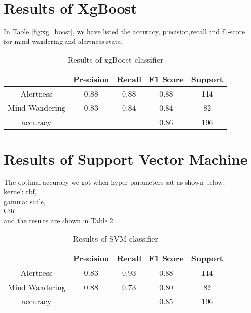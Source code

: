 \section{Results of XgBoost }
In Table \ref{fig:xg_boost}, we have listed the accuracy, precision,recall and f1-score for mind wandering and alertness state.  
\begin{table}[ht]
    \centering
     \caption{Results of xgBoost classifier }
     {\renewcommand{\arraystretch}{1.2}
    \begin{tabular}{ccccc}
       \hline
       \hline
         & Precision & Recall & F1 Score & Support \\
        \hline
          Alertness   &    0.88    &  0.88      & 0.88      & 114 \\
         Mind Wandering      & 0.83 &     0.84      & 0.84       & 82 \\
    accuracy   &            &            & 0.86      & 196 \\
          \hline
          \hline
    \end{tabular}
    }
    \label{tab:xqboost_res}
\end{table}

\section{Results of Support Vector Machine }
The optimal accuracy we got when hyper-parameters sat as shown below:\\
kernel: rbf,\\
gamma: scale,\\
C:6 \\ 
and the results are shown in Table \ref{tab:SVM_res}.
\begin{table}[ht]
    \centering
    \caption{Results of SVM classifier}
    {\renewcommand{\arraystretch}{1.2}
    \begin{tabular}{ccccc}
       \hline
       \hline
         & Precision & Recall & F1 Score & Support \\
        \hline
         Alertness    &   0.83 &    0.93 &     0.88 &       114\\
         Mind Wandering    &   0.88  &    0.73 &      0.80      &  82 \\
        accuracy    &          &            &     0.85      & 196 \\
          \hline
          \hline
    \end{tabular}
    }
    \label{tab:SVM_res}
\end{table}
